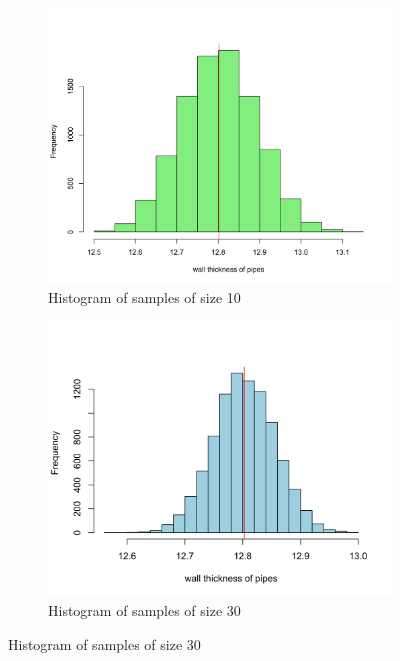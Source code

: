 \documentclass[10pt,leter,openany]{article}
\begin{document}
			\begin{figure}
				\centering
				\begin{subfigure}[b]{0.45\textwidth}
					\centering
					\includegraphics[width=\textwidth]{img/hist_sample10}
					\caption[]%
					{{\small Histogram of samples of size 10}}    
					\label{fig:sample10}
				\end{subfigure}
				\hfill
				\begin{subfigure}[b]{0.45\textwidth}  
					\centering 
					\includegraphics[width=\textwidth]{img/hist_sample30}
					\caption[]%
					{{\small Histogram of samples of size 30}}    

\end{subfigure}
\end{figure}
\end{document}
